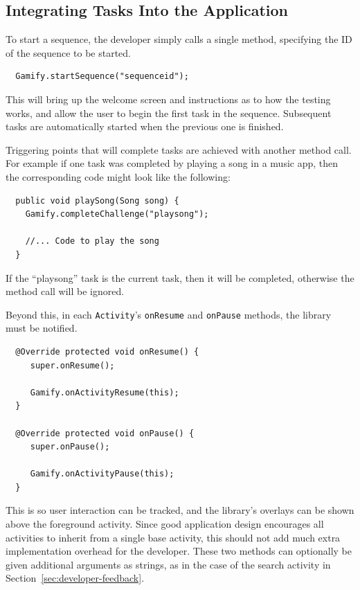 \subsection{Integrating Tasks Into the Application}

To start a sequence, the developer simply calls a single method,
specifying the ID of the sequence to be started.

\begin{verbatim}
  Gamify.startSequence("sequenceid");
\end{verbatim}

This will bring up the welcome screen and instructions as to how
the testing works, and allow the user to begin the first task in
the sequence. Subsequent tasks are automatically started when the
previous one is finished.

Triggering points that will complete tasks are achieved with another
method call. For example if one task was completed by playing a
song in a music app, then the corresponding code might look like
the following:

\begin{verbatim}
  public void playSong(Song song) {
    Gamify.completeChallenge("playsong");

    //... Code to play the song
  }
\end{verbatim}

If the ``playsong'' task is the current task, then it will be
completed, otherwise the method call will be ignored.

Beyond this, in each \verb|Activity|'s \verb|onResume| and
\verb|onPause| methods, the library must be notified.

\begin{verbatim}
  @Override protected void onResume() {
     super.onResume();

     Gamify.onActivityResume(this);
  }

  @Override protected void onPause() {
     super.onPause();

     Gamify.onActivityPause(this);
  }
\end{verbatim}

This is so user interaction can be tracked, and the library's
overlays can be shown above the foreground activity. Since good application
design encourages all activities to inherit from a single
base activity, this should not add much extra implementation overhead for the
developer. These two methods can optionally be given additional
arguments as strings, as in the case of the search activity in
Section~\ref{sec:developer-feedback}.

